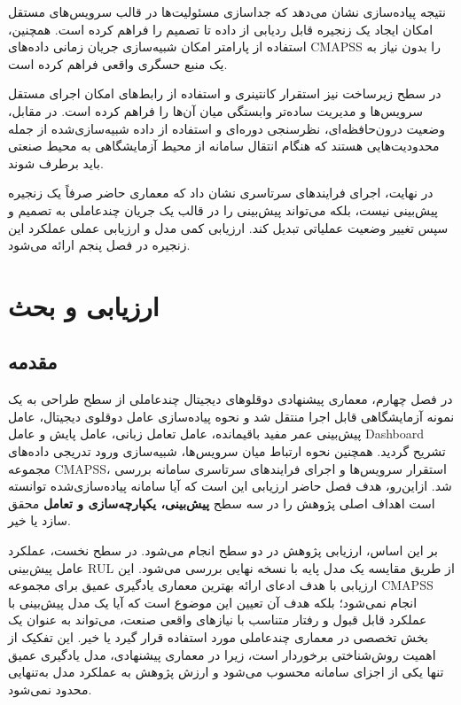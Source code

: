 \documentclass[a4paper,fleqn]{report}
\begin{document}
نتیجه پیاده‌سازی نشان می‌دهد که جداسازی مسئولیت‌ها در قالب سرویس‌های مستقل امکان ایجاد یک زنجیره قابل ردیابی از داده تا تصمیم را فراهم کرده است. همچنین، استفاده از پارامتر  امکان شبیه‌سازی جریان زمانی داده‌های \gls{CMAPSS} را بدون نیاز به یک منبع حسگری واقعی فراهم کرده است.

در سطح زیرساخت نیز استقرار کانتینری و استفاده از رابط‌های  امکان اجرای مستقل سرویس‌ها و مدیریت ساده‌تر وابستگی میان آن‌ها را فراهم کرده است. در مقابل، وضعیت درون‌حافظه‌ای، نظرسنجی دوره‌ای و استفاده از داده شبیه‌سازی‌شده از جمله محدودیت‌هایی هستند که هنگام انتقال سامانه از محیط آزمایشگاهی به محیط صنعتی باید برطرف شوند.

در نهایت، اجرای فرایند‌های سرتاسری نشان داد که معماری حاضر صرفاً یک زنجیره پیش‌بینی نیست، بلکه می‌تواند پیش‌بینی را در قالب یک جریان چندعاملی به تصمیم و سپس تغییر وضعیت عملیاتی تبدیل کند. ارزیابی کمی مدل و ارزیابی عملی عملکرد این زنجیره در فصل پنجم ارائه می‌شود.


\chapter{ارزیابی و بحث}
\label{chap:eval}

\section{مقدمه}
\label{sec:eval-introduction}

در فصل چهارم، معماری پیشنهادی دوقلوهای دیجیتال چندعاملی از سطح طراحی به یک نمونه آزمایشگاهی قابل اجرا منتقل شد و نحوه پیاده‌سازی عامل دوقلوی دیجیتال، عامل پیش‌بینی عمر مفید باقیمانده، عامل تعامل زبانی، عامل پایش و عامل \gls{Dashboard} تشریح گردید. همچنین نحوه ارتباط میان سرویس‌ها، شبیه‌سازی ورود تدریجی داده‌های مجموعه \gls{CMAPSS}، استقرار سرویس‌ها و اجرای فرایندهای سرتاسری سامانه بررسی شد. ازاین‌رو، هدف فصل حاضر ارزیابی این است که آیا سامانه پیاده‌سازی‌شده توانسته است اهداف اصلی پژوهش را در سه سطح \textbf{پیش‌بینی، یکپارچه‌سازی و تعامل} محقق سازد یا خیر.

بر این اساس، ارزیابی پژوهش در دو سطح انجام می‌شود. در سطح نخست، عملکرد عامل پیش‌بینی \gls{RUL} از طریق مقایسه یک مدل پایه با نسخه نهایی بررسی می‌شود. این ارزیابی با هدف ادعای ارائه بهترین معماری یادگیری عمیق برای مجموعه \gls{CMAPSS} انجام نمی‌شود؛ بلکه هدف آن تعیین این موضوع است که آیا یک مدل پیش‌بینی با عملکرد قابل قبول و رفتار متناسب با نیازهای واقعی صنعت، می‌تواند به عنوان یک بخش تخصصی در معماری چندعاملی مورد استفاده قرار گیرد یا خیر. این تفکیک از اهمیت روش‌شناختی برخوردار است، زیرا در معماری پیشنهادی، مدل یادگیری عمیق تنها یکی از اجزای سامانه محسوب می‌شود و ارزش پژوهش به عملکرد مدل به‌تنهایی محدود نمی‌شود.
\end{document}
